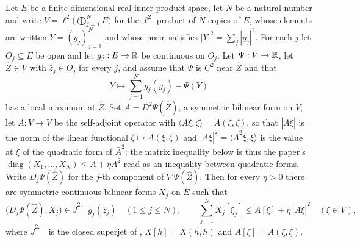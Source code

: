\begin{lemma}
Let $E$ be a finite-dimensional real inner-product space, let $N$ be a natural
number and write $V=\ell^2\bigl(\bigoplus_{j=1}^NE\bigr)$ for the $\ell^2$-product
of $N$ copies of $E$, whose elements are written $Y=(y_j)_{j=1}^N$ and whose norm
satisfies $|Y|^2=\sum_j|y_j|^2$. For each $j$ let $O_j\subseteq E$ be open and
let $g_j:E\to\mathbb{R}$ be continuous on $O_j$. Let $\Psi:V\to\mathbb{R}$, let
$\widehat Z\in V$ with $\widehat z_j\in O_j$ for every $j$, and assume that
$\Psi$ is $C^2$ near $\widehat Z$ and that
\[
  Y\longmapsto\sum_{j=1}^Ng_j(y_j)-\Psi(Y)
\]
has a local maximum at $\widehat Z$. Set $A=D^2\Psi(\widehat Z)$, a symmetric
bilinear form on $V$, let $\bar A:V\to V$ be the self-adjoint operator with
$\langle\bar A\xi,\zeta\rangle=A(\xi,\zeta)$, so that $|\bar A\xi|$ is the norm
of the linear functional $\zeta\mapsto A(\xi,\zeta)$ and
$|\bar A\xi|^2=\langle\bar A^2\xi,\xi\rangle$ is the value at $\xi$ of the
quadratic form of $\bar A^2$; the matrix inequality below is thus the paper's
$\operatorname{diag}(X_1,\ldots,X_N)\le A+\eta A^2$ read as an inequality
between quadratic forms. Write
$D_j\Psi(\widehat Z)$ for the $j$-th component of $\nabla\Psi(\widehat Z)$. Then
for every $\eta>0$ there are symmetric continuous bilinear forms $X_j$ on $E$
such that
\[
  \bigl(D_j\Psi(\widehat Z),X_j\bigr)\in\overline J^{2,+}g_j(\widehat z_j)
  \quad(1\le j\le N),
  \qquad
  \sum_{j=1}^NX_j[\xi_j]\le A[\xi]+\eta\,|\bar A\xi|^2
  \quad(\xi\in V),
\]
where $\overline J^{2,+}$ is the closed superjet of ,
$X[h]=X(h,h)$ and $A[\xi]=A(\xi,\xi)$.
\end{lemma}
